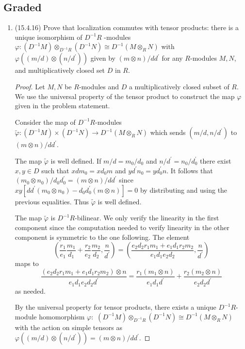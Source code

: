 \documentclass[11pt]{article}
\newcommand{\br}[1]{\left(#1\right)}
\begin{document}
\subsection*{Graded}
\begin{enumerate}
    \item (15.4.16) Prove that localization commutes with tensor products: there is a unique isomorphism of $D^{-1}R$ -modules $\varphi\colon (D^{-1}M)\otimes_{D^{-1}R} (D^{-1}N)\cong D^{-1}(M\otimes_R N)$ with $\varphi((m/d)\otimes(n/d^\prime))$ given by $(m\otimes n)/dd^\prime$ for any $R$-modules $M,N$, and multiplicatively closed set $D$ in $R$. \begin{proof}
        Let $M,N$ be $R$-modules and $D$ a multiplicatively closed subset of $R$. We use the universal property of the tensor product to construct the map $\varphi$ given in the problem statement. 

        Consider the map of $D^{-1}R$-modules $\tilde{\varphi}\colon (D^{-1}M)\times (D^{-1}N)\to D^{-1}(M\otimes_R N)$ which sends $(m/d,n/d^\prime)$ to $(m\otimes n)/dd^\prime$.
        
        The map $\tilde{\varphi}$ is well defined. If $m/d = m_0/d_0$ and $n/d^\prime = n_0/d^\prime_0$ there exist $x,y\in D$ such that $xdm_0 = xd_0m$ and $yd^\prime n_0 = yd^\prime_0n$. It follows that $(m_0\otimes n_0)/d_0d_0^\prime = (m\otimes n)/dd^\prime$ since $xy[dd^\prime(m_0\otimes n_0) - d_0d_0^\prime(m\otimes n)] = 0$ by distributing and using the previous equalities. Thus $\tilde{\varphi}$ is well defined. 

        The map $\tilde{\varphi}$ is $D^{-1}R$-bilinear. We only verify the linearity in the first component since the computation needed to verify linearity in the other component is symmetric to the one following. The element \[\br{\frac{r_1}{e_1}\frac{m_1}{d_1}+\frac{r_2}{e_2}\frac{m_2}{d_2},\frac{n}{d^\prime}} = \br{\frac{e_2d_2r_1m_1 + e_1d_1r_2m_2}{e_1d_1e_2d_2},\frac{n}{d^\prime}}\] maps to \[\frac{(e_2d_2r_1m_1 + e_1d_1r_2m_2)\otimes n}{e_1d_1e_2d_2d^\prime} = \frac{r_1(m_1\otimes n)}{e_1d_1d^\prime} + \frac{r_2(m_2\otimes n)}{e_2d_2d^\prime}\] as needed.

        By the universal property for tensor products, there exists a unique $D^{-1}R$-module homomorphism $\varphi\colon $ $(D^{-1}M)\otimes_{D^{-1}R} (D^{-1}N)\cong D^{-1}(M\otimes_R N)$ with the action on simple tensors as $\varphi((m/d)\otimes(n/d^\prime)) = (m\otimes n)/dd^\prime$.


\end{proof}
\end{enumerate}
\end{document}

